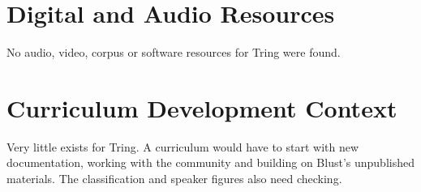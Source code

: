 \documentclass[12pt]{article}
\begin{document}
\section{Digital and Audio Resources}
No audio, video, corpus or software resources for Tring were found.

\section{Curriculum Development Context}
Very little exists for Tring. A curriculum would have to start with new documentation, working with the community and building on Blust's unpublished materials. The classification and speaker figures also need checking.
\end{document}
